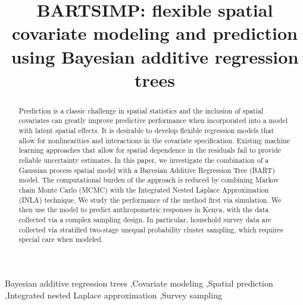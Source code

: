 \documentclass[preprint,12pt,authoryear]{elsarticle}
\begin{document}
\begin{frontmatter}


\title{BARTSIMP: flexible spatial covariate modeling and prediction using Bayesian additive regression trees} %



\begin{abstract}
Prediction is a classic challenge in spatial statistics and the inclusion of spatial covariates can greatly improve predictive performance when incorporated into a model with latent spatial effects. It is desirable to develop flexible regression models that allow for nonlinearities and interactions in the covariate specification. Existing machine learning approaches that allow for spatial dependence in the residuals fail to provide reliable uncertainty estimates. In this paper, we investigate the combination of a Gaussian process spatial model with a Bayesian Additive Regression Tree (BART) model. The computational burden of the approach is reduced by combining Markov chain Monte Carlo (MCMC) with the Integrated Nested Laplace Approximation (INLA) technique. We study the performance of the method first via simulation. We then use the model to predict anthropometric responses in Kenya, with the data collected via a complex sampling design. In particular, household survey data are collected via stratified two-stage unequal probability cluster sampling, which requires special care when modeled. 
\end{abstract}



\begin{keyword}
{Bayesian additive regression trees} \sep {Covariate modeling} \sep {Spatial prediction} \sep {Integrated nested Laplace approximation} \sep {Survey sampling}


\end{keyword}

\end{frontmatter}
\end{document}
